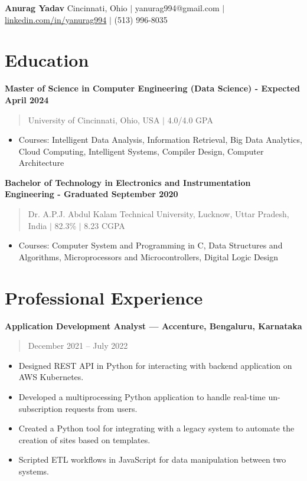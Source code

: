 \documentclass[]{article}
\begin{document}
	\begin{center}
		\textbf{\LARGE Anurag Yadav}
		Cincinnati, Ohio $|$ yanurag994@gmail.com $|$ \href{https://www.linkedin.com/in/yanurag994}{linkedin.com/in/yanurag994} $|$ (513) 996-8035
	\end{center}

	\section*{Education}

	\textbf{Master of Science in Computer Engineering (Data Science) - Expected April 2024}
	\begin{quote}
		University of Cincinnati, Ohio, USA $|$ 4.0/4.0 GPA
	\end{quote}
	\begin{itemize}
		\item Courses: Intelligent Data Analysis, Information Retrieval, Big Data Analytics, Cloud Computing, Intelligent Systems, Compiler Design, Computer Architecture
	\end{itemize}

	\textbf{Bachelor of Technology in Electronics and Instrumentation Engineering - Graduated September 2020}
	\begin{quote}
		Dr. A.P.J. Abdul Kalam Technical University, Lucknow, Uttar Pradesh, India $|$ 82.3\% $|$ 8.23 CGPA
	\end{quote}
	\begin{itemize}
		\item Courses: Computer System and Programming in C, Data Structures and Algorithms, Microprocessors and Microcontrollers, Digital Logic Design
	\end{itemize}

	\section*{Professional Experience}

	\textbf{Application Development Analyst --- Accenture, Bengaluru, Karnataka}
	\begin{quote}
		December 2021 -- July 2022
	\end{quote}
	\begin{itemize}
		\item Designed REST API in Python for interacting with backend application on AWS Kubernetes.
		\item Developed a multiprocessing Python application to handle real-time un-subscription requests from users.
		\item Created a Python tool for integrating with a legacy system to automate the creation of sites based on templates.
		\item Scripted ETL workflows in JavaScript for data manipulation between two systems.
	\end{itemize}
\end{document}
